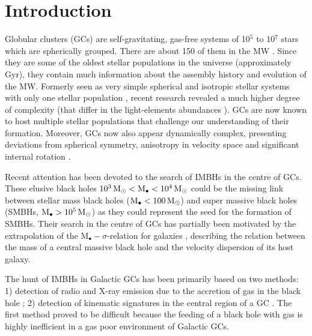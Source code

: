 

\section{Introduction}\label{sec:Introduction}
Globular clusters (\acsp{GC}) are self-gravitating, gas-free systems of 10\(^5\) to 10\(^7\) stars which are spherically grouped. There are about 150 of them in the \ac{MW} \citep{1996AJ....112.1487H}. Since they are some of the oldest stellar populations in the universe (approximately \unit[13]{Gyr}), they contain much information about the assembly history and evolution of the \ac{MW}. Formerly seen as very simple spherical and isotropic stellar systems with only one stellar population \citep{1997A&ARv...8....1M}, recent research revealed a much higher degree of complexity (that differ in the light-elements abundances \citep{2015AJ....149...91P}). \acp{GC} are now known to host multiple stellar populations that challenge our understanding of their formation. Moreover, \acp{GC} now also appear dynamically complex, presenting deviations from spherical symmetry, anisotropy in velocity space and significant internal rotation \citep{2012A&A...539A..65Z,2013ApJ...772...67B,2014A&A...567A..69K}.
\par Recent attention has been devoted to the search of \acfp{IMBH} in the centre of \acp{GC}. These elusive black holes \(\unit[10^3]{\mathrm{M}_\odot} < \mathrm{M}_\bullet < \unit[10^4]{\mathrm{M}_\odot}\) could be the missing link between stellar mass black holes (\(\mathrm{M}_\bullet < \unit[100]{\mathrm{M}_\odot}\)) and super massive black holes (\acsp{SMBH}, \(\mathrm{M}_\bullet > \unit[10^5]{\mathrm{M}_\odot}\)) as they could represent the seed for the formation of \acp{SMBH}. Their search in the centre of \acp{GC} has partially been motivated by the extrapolation of the \(\mathrm{M}_\bullet-\sigma\)-relation for galaxies \citep{2000ApJ...539L...9F}, describing the relation between the mass of a central massive black hole and the velocity dispersion of its host galaxy.
\par The hunt of \acp{IMBH} in Galactic \acp{GC} has been primarily based on two methods: 1) detection of radio and X-ray emission due to the accretion of gas in the black hole \citep{2002MNRAS.330..232C,2008MNRAS.389..379M,2012A&A...542A..44K,2012ApJ...750L..27S}; 2) detection of kinematic signatures in the central region of a \ac{GC} \citep{1976ApJ...209..214B,2013A&A...552A..49L}. The first method proved to be difficult because the feeding of a black hole with gas is highly inefficient in a gas poor environment of Galactic \acp{GC}. 
